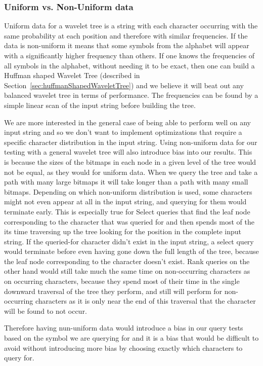 \subsubsection{Uniform vs. Non-Uniform data}
\label{sec:expnotesUniformVsNonuniform}
Uniform data for a wavelet tree is a string with each character occurring with the same probability at each position and therefore with similar frequencies.
If the data is non-uniform it means that some symbols from the alphabet will appear with a significantly higher frequency than others.
If one knows the frequencies of all symbols in the alphabet, without needing it to be exact, then one can build a Huffman shaped Wavelet Tree (described in Section~\ref{sec:huffmanShapedWaveletTree}) and we believe it will beat out any balanced wavelet tree in terms of performance.
The frequencies can be found by a simple linear scan of the input string before building the tree.

We are more interested in the general case of being able to perform well on any input string and so we don't want to implement optimizations that require a specific character distribution in the input string.
Using non-uniform data for our testing with a general wavelet tree will also introduce bias into our results.
This is because the sizes of the bitmaps in each node in a given level of the tree would not be equal, as they would for uniform data.
When we query the tree and take a path with many large bitmaps it will take longer than a path with many small bitmaps.
Depending on which non-uniform distribution is used, some characters might not even appear at all in the input string, and querying for them would terminate early.
This is especially true for Select queries that find the leaf node corresponding to the character that was queried for and then spends most of the its time traversing up the tree looking for the position in the complete input string.
If the queried-for character didn't exist in the input string, a select query would terminate before even having gone down the full length of the tree, because the leaf node corresponding to the character doesn't exist.
Rank queries on the other hand would still take much the same time on non-occurring characters as on occurring characters, because they spend most of their time in the single downward traversal of the tree they perform, and still will perform for non-occurring characters as it is only near the end of this traversal that the character will be found to not occur.

Therefore having nun-uniform data would introduce a bias in our query tests based on the symbol we are querying for and it is a bias that would be difficult to avoid without introducing more bias by choosing exactly which characters to query for.

